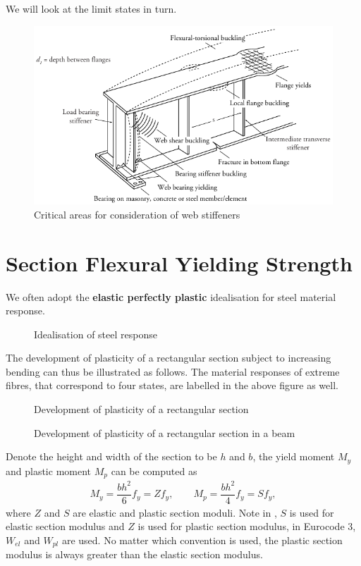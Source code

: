 We will look at the limit states in turn.
\begin{figure}[H]
\centering
\includegraphics[width=.99\textwidth]{PIC/CH05/CA}
\caption{Critical areas for consideration of web stiffeners \citep{Gorenc2015}}
\end{figure}
\section{Section Flexural Yielding Strength}
We often adopt the \textbf{elastic perfectly plastic} idealisation for steel material response.
\begin{figure}[H]
\centering

\caption{Idealisation of steel response}
\end{figure}

The development of plasticity of a rectangular section subject to increasing bending can thus be illustrated as follows. The material responses of extreme fibres, that correspond to four states, are labelled in the above figure as well.
\begin{figure}[H]
\centering

\caption{Development of plasticity of a rectangular section}
\end{figure}
\begin{figure}[H]
\centering

\caption{Development of plasticity of a rectangular section in a beam}
\end{figure}
Denote the height and width of the section to be $h$ and $b$, the yield moment $M_y$ and plastic moment $M_p$ can be computed as
\begin{gather*}
M_y=\dfrac{bh^2}{6}f_y=Zf_y,\qquad
M_p=\dfrac{bh^2}{4}f_y=Sf_y,
\end{gather*}
where $Z$ and $S$ are elastic and plastic section moduli. Note in \ANSI{}, $S$ is used for elastic section modulus and $Z$ is used for plastic section modulus, in Eurocode 3, $W_{el}$ and $W_{pl}$ are used. No matter which convention is used, the plastic section modulus is always greater than the elastic section modulus.
\begin{figure}[H]
\centering

\end{figure}


